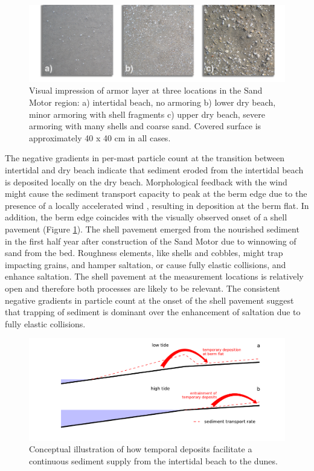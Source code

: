 \begin{figure}
  \centering
  \includegraphics[width=\columnwidth]{../Figures/armoring_small}
  \caption{Visual impression of armor layer at three locations in the
    Sand Motor region: a) intertidal beach, no armoring b) lower dry
    beach, minor armoring with shell fragments c) upper dry beach,
    severe armoring with many shells and coarse sand. Covered surface
    is approximately 40 x 40 cm in all cases.}
  \label{fig:armoring}
\end{figure}

The negative gradients in per-mast particle count at the transition
between intertidal and dry beach indicate that sediment eroded from
the intertidal beach is deposited locally on the dry
beach. Morphological feedback with the wind might cause
the sediment transport capacity to peak at the berm edge due to the
presence of a locally accelerated wind \citep[i.e. jet
flow;][]{Hesp2016}, resulting in deposition at the berm flat. In
addition, the berm edge coincides with the visually observed onset of
a shell pavement (Figure \ref{fig:armoring}).  The shell
pavement emerged from the nourished sediment in the first half year
after construction of the Sand Motor \citep{Hoonhout2017a} due to
winnowing of sand from the bed. Roughness elements, like shells and
cobbles, might trap impacting grains, and hamper saltation, or cause
fully elastic collisions, and enhance saltation. The shell pavement at
the measurement locations is relatively open and therefore both
processes are likely to be relevant. The consistent negative gradients
in particle count at the onset of the shell pavement suggest that
trapping of sediment is dominant over the enhancement of saltation due
to fully elastic collisions.

\begin{figure}
 \centering
  \includegraphics[width=\columnwidth]{../Figures/temporal_deposits}
  \caption{Conceptual illustration of how temporal deposits facilitate
    a continuous sediment supply from the intertidal beach to the
    dunes.}
  \label{fig:temporal_deposits}
\end{figure}

